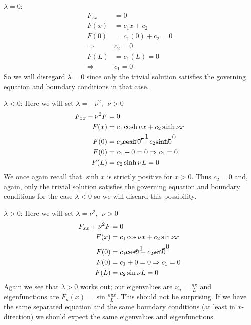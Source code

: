 \vspace{0.25cm}

\noindent\underline{$\lambda = 0$}:
\begin{align*}
F_{xx} &= 0 \\
F(x) &= c_1x + c_2 \\
F(0) &= c_1(0) + c_2 = 0 \\
\Rightarrow & c_2 = 0 \\
F(L) &= c_1(L) = 0 \\
\Rightarrow & c_1 = 0
\end{align*}
So we will disregard $\lambda = 0$ since only the trivial solution satisfies the governing equation and boundary conditions in that case.

\vspace{0.25cm}

\noindent\underline{$\lambda < 0$}:  Here we will set $\lambda = -\nu^2, \ \ \nu>0$ 
\begin{align*}
F_{xx} - \nu^2 F &= 0 \\
F(x) &= c_1 \cosh{\nu x} + c_2 \sinh{\nu x} \\
F(0) &= c_1 \cancelto{1}{\cosh{0}} + c_2 \cancelto{0}\sinh{0} \\
F(0) &= c_1 + 0 = 0 \Rightarrow c_1 = 0 \\
F(L) &= c_2 \sinh{\nu L} = 0 \\
\end{align*}
We once again recall that $\sinh{x}$ is strictly positive for $x>0$.  Thus $c_2 = 0$ and, again, only the trivial solution satisfies the governing equation and boundary conditions for the case $\lambda < 0$ so we will discard this possibility.

\vspace{0.25cm}

\noindent\underline{$\lambda > 0$}:  Here we will set $\lambda = \nu^2, \ \ \nu>0$
\begin{align*}
F_{xx} + \nu^2 F &= 0 \\
F(x) &= c_1 \cos{\nu x} + c_2 \sin{\nu x} \\
F(0) &= c_1 \cancelto{1}\cos{0} + c_2 \cancelto{0}\sin{0} \\
F(0) &= c_1 + 0 = 0 \Rightarrow c_1 = 0 \\
F(L) &= c_2 \sin{\nu L} = 0
\end{align*}
Again we see that $\lambda > 0$ works out; our eigenvalues are $\nu_n = \frac{n \pi}{L}$ and eigenfunctions are $F_n(x) = \sin{\frac{n \pi x}{L}}$.  This should not be surprising.  If we have the same separated equation and the same boundary conditions (at least in $x$-direction) we should expect the same eigenvalues and eigenfunctions.

